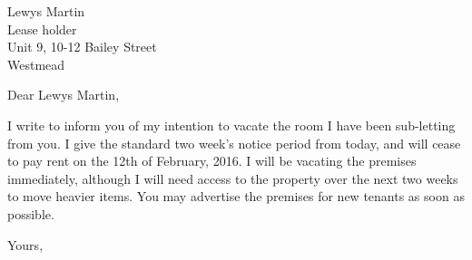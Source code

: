 \documentclass{letter}
\begin{document}
\begin{letter}{Lewys Martin \\ Lease holder \\ Unit 9, 10-12 Bailey Street \\ Westmead }
\opening{Dear Lewys Martin,}

I write to inform you of my intention to vacate the room I have been sub-letting from you. I give the standard
two week's notice period from today, and will cease to pay rent on the 12th of February, 2016. I will be
vacating the premises immediately, although I will need access to the property over the next two weeks to move
heavier items. You may advertise the premises for new tenants as soon as possible.

\closing{Yours,}

\end{letter}
\end{document}
